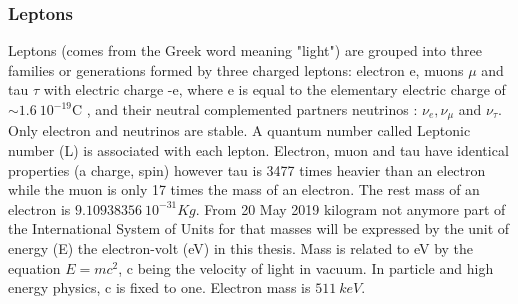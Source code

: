 \subsubsection{Leptons}
Leptons (comes from the Greek word meaning "light") are grouped into three families or generations formed by three charged leptons: electron e, muons $\mu$ and tau $\tau$ with electric charge -e, where e is equal to the elementary electric charge of $\sim 1.6 \ 10^{-19} $C \cite{PDG}, and their neutral complemented partners neutrinos : $\nu_{e}, \nu_{\mu}$ and $\nu_{\tau}$. Only electron and neutrinos are stable. A quantum number called Leptonic number (L) is associated with each lepton. Electron, muon and tau have identical properties (a charge, spin) however tau is 3477 times heavier than an electron while the muon is only 17 times the mass of an electron. The rest mass of an electron is $9.10938356 \ 10^{-31} Kg$. From 20 May 2019 kilogram not anymore part of the International System of Units for that masses will be expressed by the unit of energy (E) the electron-volt (eV) in this thesis. Mass is related to eV by the equation $E=mc^2$, c being the velocity of light in vacuum. In particle and high energy physics, c is fixed to one. Electron mass is $511 \ keV$.
